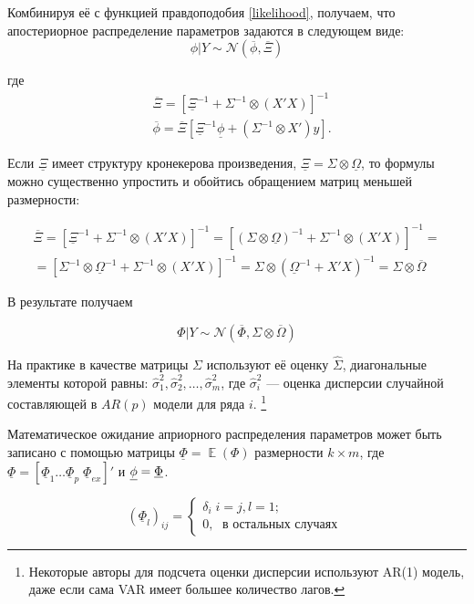 \documentclass[11pt]{article} %
\DeclareMathOperator{\E}{\mathbb{E}}
\newcommand{\cN}{\mathcal{N}}
\newcommand{\prior}{\underline}
\newcommand{\post}{\overline}
\let\vec\relax
\DeclareMathOperator{\vec}{vec}
\begin{document}
Комбинируя её с функцией правдоподобия \eqref{likelihood}, получаем, что апостериорное распределение параметров задаются в следующем виде:
\begin{equation}
\phi|Y\sim \cN(\post{\phi},\post \Xi)
\end{equation}

где
\begin{align*}
&\post \Xi=[\prior \Xi^{-1}+\Sigma^{-1}\otimes(X'X)]^{-1}\\
& \post \phi=\post{\Xi}[\prior \Xi^{-1}\prior \phi+(\Sigma^{-1}\otimes X')y].
\end{align*}

Если $\prior\Xi$ имеет структуру кронекерова произведения, $\prior\Xi = \Sigma \otimes \prior{\Omega}$, то формулы можно существенно упростить и обойтись обращением матриц меньшей размерности:

\begin{multline}
\post \Xi=[\prior \Xi^{-1}+\Sigma^{-1}\otimes(X'X)]^{-1}=[(\Sigma \otimes \prior\Omega)^{-1}+\Sigma^{-1}\otimes(X'X)]^{-1}=\\
=[\Sigma^{-1}\otimes  \prior\Omega^{-1} +\Sigma^{-1}\otimes(X'X)]^{-1}=\Sigma \otimes (\prior\Omega^{-1}+ X'X)^{-1} = \Sigma \otimes \post \Omega
\end{multline}

В результате получаем 

\[
\Phi | Y \sim \cN (\post\Phi, \Sigma \otimes \post\Omega)
\]

На практике в качестве матрицы $\Sigma$ используют её оценку $\hat\Sigma$, диагональные элементы которой равны: $\hat\sigma_{1}^2, \hat\sigma_{2}^2,\ldots,\hat\sigma_{m}^2 $, где  $\hat\sigma_{i}^2$ --- оценка дисперсии случайной составляющей в $AR(p)$ модели для ряда $i$. \footnote{Некоторые авторы для подсчета оценки дисперсии используют AR(1) модель, даже если сама VAR имеет большее количество лагов.}

Математическое ожидание априорного распределения параметров может быть записано с помощью матрицы $\prior \Phi = \E (\Phi)$ размерности $k\times m$, где $\prior\Phi=[\prior\Phi_1 \ldots \prior\Phi_p \; \prior\Phi_{ex}]'$ и $\prior \phi = \vec{ \prior \Phi}$.


\begin{equation}
(\prior\Phi_l)_{ij}=
\begin{cases}
\delta_i\; i=j, l=1;\\
0,\;\text{ в остальных случаях }
\end{cases}\label{minnesota_exp}
\end{equation}
\end{document}
